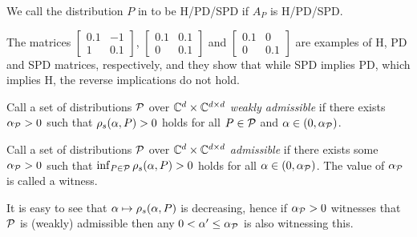 \begin{definition}\label{distpd}
We call the distribution $P$ in  to be H/PD/SPD if $A_P$ is H/PD/SPD.
\end{definition}
\begin{example}
The matrices $\begin{bmatrix}0.1 &-1\\ 1 & 0.1\end{bmatrix}$, $\begin{bmatrix} 0.1 & 0.1 \\ 0 & 0.1\end{bmatrix}$ and $\begin{bmatrix}0.1 &0 \\ 0 & 0.1\end{bmatrix}$ are examples of H, PD and SPD matrices, respectively, and they show that while SPD implies PD, which implies H, the reverse implications do not hold.
\end{example}

\begin{definition}
Call a set of distributions $\P$ over $\C^{d}\times \C^{\dcd}$
\emph{weakly admissible} if there exists $\alpha_{\P}>0$ such that
$\rhos{P}>0$ holds for all $P\in \P$ and $\alpha\in(0,\alpha_{\P})$.
\end{definition}
\begin{definition}
Call a set of distributions $\P$ over $\C^{d}\times \C^{\dcd}$ \emph{admissible}
if there exists some $\alpha_{\P}>0$ such that $\inf_{P\in \P} \rhos{P}>0$ holds for all $\alpha\in(0,\alpha_{\P})$.
The value of $\alpha_{\P}$ is called a witness.
\end{definition}

It is easy to see that $\alpha \mapsto \rhos{P}$ is decreasing,
hence if $\alpha_{\P}>0$ witnesses that $\P$ is (weakly) admissible
then any $0<\alpha'\le \alpha_{\P}$ is also witnessing this.
